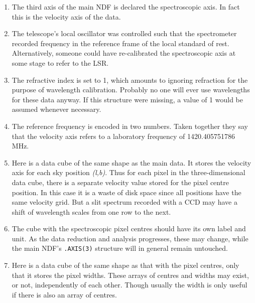 \documentclass[11pt,twoside]{article}
\begin{document}
\begin{enumerate}
\item The third axis of the main NDF is declared the spectroscopic axis.
   In fact this is the velocity axis of the data.

\item The telescope's local oscillator was controlled such that the
   spectrometer recorded frequency in the reference frame of the local
   standard of rest. Alternatively, someone could have re-calibrated the
   spectroscopic axis at some stage to refer to the LSR.

\item The refractive index is set to 1, which amounts to ignoring
   refraction for the purpose of wavelength calibration. Probably no one
   will ever use wavelengths for these data anyway. If this structure
   were missing, a value of 1 would be assumed whenever necessary.

\item The reference frequency is encoded in two numbers. Taken together
   they say that the velocity axis refers to a laboratory frequency of
   1420.405751786 MHz.

\item Here is a data cube of the same shape as the main data. It stores
   the velocity axis for each sky position {\it(l,b)}. Thus for each
   pixel in the three-dimensional data cube, there is a separate
   velocity value stored for the pixel centre position. In this case it
   is a waste of disk space since all positions have the same velocity
   grid. But a slit spectrum recorded with a CCD may have a shift of
   wavelength scales from one row to the next.

\item The cube with the spectroscopic pixel centres should have its own
   label and unit. As the data reduction and analysis progresses, these
   may change, while the main NDF's {\tt .AXIS(3)} structure will in
   general remain untouched.

\item Here is a data cube of the same shape as that with the pixel
   centres, only that it stores the pixel widths. These arrays of centres
   and widths may exist, or not, independently of each other.  Though
   usually the width is only useful if there is also an array of
   centres.


\end{enumerate}
\end{document}
